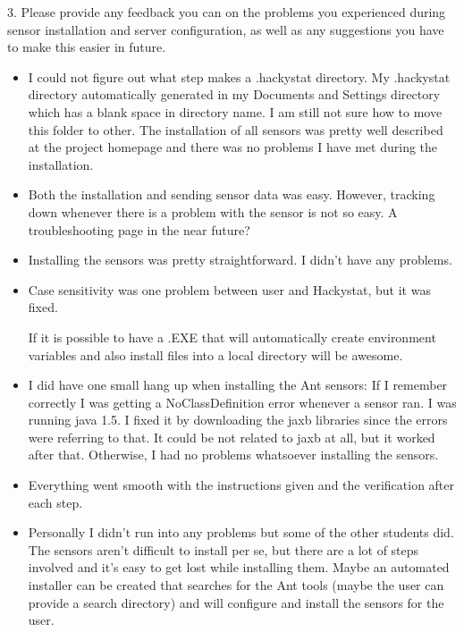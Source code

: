 \documentclass[11pt]{article}
\begin{document}
3. Please provide any feedback you can on the problems you 
experienced during sensor installation and server conﬁguration, as well as any suggestions you have to make this easier 
in future.
\begin{itemize}
\item I could not figure out what step makes a .hackystat directory. My .hackystat directory automatically generated in my Documents and Settings directory which has a blank space in directory name. I am still not sure how to move this folder to other. The installation of all sensors was pretty well described at the project homepage and there was no problems I have met during the installation. 

\item Both the installation and sending sensor data was easy.  However, tracking down whenever there is a problem with the sensor is not so easy.  A troubleshooting page in the near future?

\item Installing the sensors was pretty straightforward.  I didn't have any problems.

\item Case sensitivity was one problem between user and Hackystat, but it was fixed.  

If it is possible to have a .EXE that will automatically create environment variables and also install files into a local directory will be awesome.

\item I did have one small hang up when installing the Ant sensors: If I remember correctly I was getting a NoClassDefinition error whenever a sensor ran. I was running java 1.5. I fixed it by downloading the jaxb libraries since the errors were referring to that. It could be not related to jaxb at all, but it worked after that. Otherwise, I had no problems whatsoever installing the sensors.

\item Everything went smooth with the instructions given and the verification after each step.

\item Personally I didn't run into any problems but some of the other students did. The sensors aren't difficult to install per se, but there are a lot of steps involved and it's easy to get lost while installing them. Maybe an automated installer can be created that searches for the Ant tools (maybe the user can provide a search directory) and will configure and install the sensors for the user.


\end{itemize}
\end{document}
